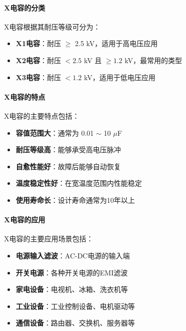 \documentclass[12pt,UTF8]{ctexbook}
\begin{document}
\paragraph{X电容的分类}

X电容根据其耐压等级可分为：

\begin{itemize}[leftmargin=2cm]
    \item \textbf{X1电容}：耐压 $\ge$ 2.5 kV，适用于高电压应用
    \item \textbf{X2电容}：耐压 $< 2.5$ kV 且 $\ge 1.2$ kV，最常用的类型
    \item \textbf{X3电容}：耐压 $< 1.2$ kV，适用于低电压应用
\end{itemize}

\paragraph{X电容的特点}

X电容的主要特点包括：

\begin{itemize}[leftmargin=2cm]
    \item \textbf{容值范围大}：通常为 0.01 $\sim$ 10 $\mu$F
    \item \textbf{耐压等级高}：能够承受高电压脉冲
    \item \textbf{自愈性能好}：故障后能够自动恢复
    \item \textbf{温度稳定性好}：在宽温度范围内性能稳定
    \item \textbf{使用寿命长}：设计寿命通常为10年以上
\end{itemize}

\paragraph{X电容的应用}

X电容的主要应用场景包括：

\begin{itemize}[leftmargin=2cm]
    \item \textbf{电源输入滤波}：AC-DC电源的输入端
    \item \textbf{开关电源}：各种开关电源的EMI滤波
    \item \textbf{家电设备}：电视机、冰箱、洗衣机等
    \item \textbf{工业设备}：工业控制设备、电机驱动等
    \item \textbf{通信设备}：路由器、交换机、服务器等
\end{itemize}
\end{document}
